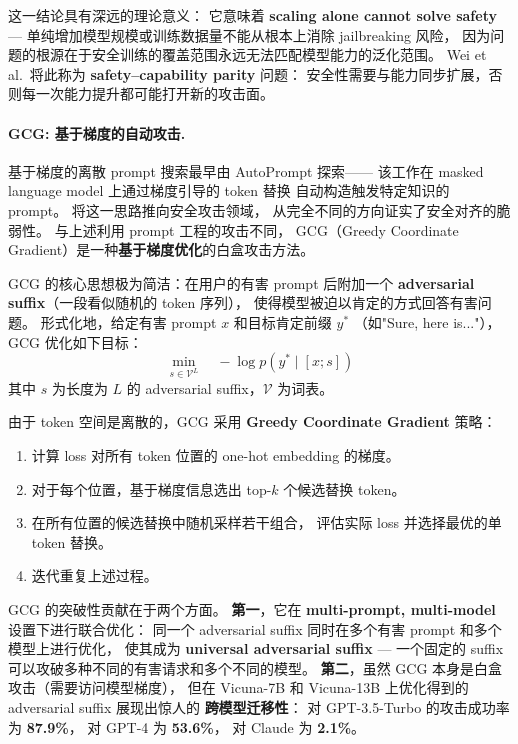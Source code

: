 \noindent
这一结论具有深远的理论意义：
它意味着 \textbf{scaling alone cannot solve safety} ---
单纯增加模型规模或训练数据量不能从根本上消除 jailbreaking 风险，
因为问题的根源在于安全训练的覆盖范围永远无法匹配模型能力的泛化范围。
Wei et al.\ 将此称为 \textbf{safety--capability parity} 问题：
安全性需要与能力同步扩展，否则每一次能力提升都可能打开新的攻击面。

\paragraph{GCG: 基于梯度的自动攻击.}
基于梯度的离散 prompt 搜索最早由
AutoPrompt \citep{shin2020autoprompt} 探索——
该工作在 masked language model 上通过梯度引导的 token 替换
自动构造触发特定知识的 prompt。
 将这一思路推向安全攻击领域，
从完全不同的方向证实了安全对齐的脆弱性。
与上述利用 prompt 工程的攻击不同，
GCG（Greedy Coordinate Gradient）是一种\textbf{基于梯度优化}的白盒攻击方法。

GCG 的核心思想极为简洁：在用户的有害 prompt 后附加一个
\textbf{adversarial suffix}（一段看似随机的 token 序列），
使得模型被迫以肯定的方式回答有害问题。
形式化地，给定有害 prompt $x$ 和目标肯定前缀 $y^*$
（如"Sure, here is..."），GCG 优化如下目标：
\begin{equation}
  \min_{s \in \mathcal{V}^L} \quad -\log p(y^* \mid [x; s])
  \label{eq:gcg-obj}
\end{equation}
其中 $s$ 为长度为 $L$ 的 adversarial suffix，$\mathcal{V}$ 为词表。

由于 token 空间是离散的，GCG 采用 \textbf{Greedy Coordinate Gradient} 策略：
\begin{enumerate}[leftmargin=2em]
  \item 计算 loss 对所有 token 位置的 one-hot embedding 的梯度。
  \item 对于每个位置，基于梯度信息选出 top-$k$ 个候选替换 token。
  \item 在所有位置的候选替换中随机采样若干组合，
    评估实际 loss 并选择最优的单 token 替换。
  \item 迭代重复上述过程。
\end{enumerate}

GCG 的突破性贡献在于两个方面。
\textbf{第一}，它在 \textbf{multi-prompt, multi-model} 设置下进行联合优化：
同一个 adversarial suffix 同时在多个有害 prompt 和多个模型上进行优化，
使其成为 \textbf{universal adversarial suffix} ---
一个固定的 suffix 可以攻破多种不同的有害请求和多个不同的模型。
\textbf{第二}，虽然 GCG 本身是白盒攻击（需要访问模型梯度），
但在 Vicuna-7B 和 Vicuna-13B 上优化得到的 adversarial suffix 展现出惊人的
\textbf{跨模型迁移性}：
对 GPT-3.5-Turbo 的攻击成功率为 \textbf{87.9\%}，
对 GPT-4 为 \textbf{53.6\%}，
对 Claude 为 \textbf{2.1\%}。

